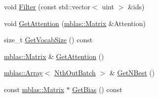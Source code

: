 \begin{DoxyCompactItemize}
\item 
void \hyperlink{classamunmt_1_1GPU_1_1Decoder_aa5fb939d73d55e711b1f8887861fb1b0}{Filter} (const std\+::vector$<$ uint $>$ \&ids)
\item 
void \hyperlink{classamunmt_1_1GPU_1_1Decoder_af7046cb6445534d3342b508e74b70cdd}{Get\+Attention} (\hyperlink{namespaceamunmt_1_1GPU_1_1mblas_ab67821a8254de53e45a623cf73c0aef6}{mblas\+::\+Matrix} \&Attention)
\item 
size\+\_\+t \hyperlink{classamunmt_1_1GPU_1_1Decoder_aa5d8596316bbebb71b2588982c64edcd}{Get\+Vocab\+Size} () const 
\item 
\hyperlink{namespaceamunmt_1_1GPU_1_1mblas_ab67821a8254de53e45a623cf73c0aef6}{mblas\+::\+Matrix} \& \hyperlink{classamunmt_1_1GPU_1_1Decoder_a096372e529ad4bb64ba8a93ca5e6f884}{Get\+Attention} ()
\item 
\hyperlink{classamunmt_1_1GPU_1_1mblas_1_1Array}{mblas\+::\+Array}$<$ \hyperlink{structamunmt_1_1GPU_1_1NthOutBatch}{Nth\+Out\+Batch} $>$ \& \hyperlink{classamunmt_1_1GPU_1_1Decoder_a9b8ac4767d8ba8cd238f6f68df9abea6}{Get\+N\+Best} ()
\item 
const \hyperlink{namespaceamunmt_1_1GPU_1_1mblas_ab67821a8254de53e45a623cf73c0aef6}{mblas\+::\+Matrix} $\ast$ \hyperlink{classamunmt_1_1GPU_1_1Decoder_a075d00afe91247c36279eaa364386ce7}{Get\+Bias} () const 
\end{DoxyCompactItemize}
